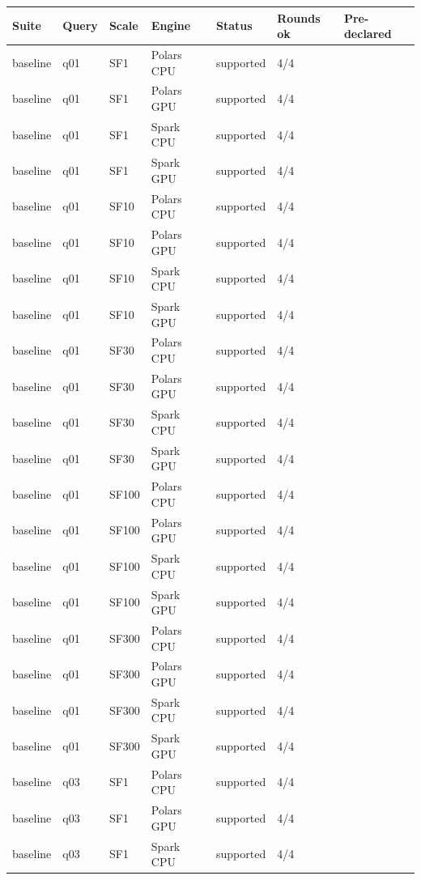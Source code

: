 \begin{longtable}{lllllll}
\toprule
Suite & Query & Scale & Engine & Status & Rounds ok & Pre-declared \\
\midrule
\endhead
\bottomrule
\endfoot
baseline & q01 & SF1 & Polars CPU & supported & 4/4 &  \\
baseline & q01 & SF1 & Polars GPU & supported & 4/4 &  \\
baseline & q01 & SF1 & Spark CPU & supported & 4/4 &  \\
baseline & q01 & SF1 & Spark GPU & supported & 4/4 &  \\
baseline & q01 & SF10 & Polars CPU & supported & 4/4 &  \\
baseline & q01 & SF10 & Polars GPU & supported & 4/4 &  \\
baseline & q01 & SF10 & Spark CPU & supported & 4/4 &  \\
baseline & q01 & SF10 & Spark GPU & supported & 4/4 &  \\
baseline & q01 & SF30 & Polars CPU & supported & 4/4 &  \\
baseline & q01 & SF30 & Polars GPU & supported & 4/4 &  \\
baseline & q01 & SF30 & Spark CPU & supported & 4/4 &  \\
baseline & q01 & SF30 & Spark GPU & supported & 4/4 &  \\
baseline & q01 & SF100 & Polars CPU & supported & 4/4 &  \\
baseline & q01 & SF100 & Polars GPU & supported & 4/4 &  \\
baseline & q01 & SF100 & Spark CPU & supported & 4/4 &  \\
baseline & q01 & SF100 & Spark GPU & supported & 4/4 &  \\
baseline & q01 & SF300 & Polars CPU & supported & 4/4 &  \\
baseline & q01 & SF300 & Polars GPU & supported & 4/4 &  \\
baseline & q01 & SF300 & Spark CPU & supported & 4/4 &  \\
baseline & q01 & SF300 & Spark GPU & supported & 4/4 &  \\
baseline & q03 & SF1 & Polars CPU & supported & 4/4 &  \\
baseline & q03 & SF1 & Polars GPU & supported & 4/4 &  \\
baseline & q03 & SF1 & Spark CPU & supported & 4/4 &  \\

\end{longtable}
